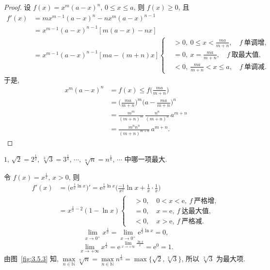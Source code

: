 \begin{proof}
设 $f(x)=x^{m}(a-x)^{n}$, $0\leqslant x\leqslant a$, 则 $f(x)\geqslant 0$, 且
\[
\begin{aligned}
f'(x)&=mx^{m-1}(a-x)^{n}-nx^{m}(a-x)^{n-1}\\
&=x^{m-1}(a-x)^{n-1}[m(a-x)-nx]\\
&=x^{m-1}(a-x)^{n-1}[ma-(m+n)x]
\left\{
\begin{aligned}
&>0,\ 0\leqslant x<\frac{ma}{m+n},\quad f\ \text{单调增},\\
&=0,\ x=\frac{ma}{m+n},\quad f\ \text{取最大值},\\
&<0,\ \frac{ma}{m+n}<x\leqslant a,\quad f\ \text{单调减}.
\end{aligned}
\right.
\end{aligned}
\]
于是,
\[
\begin{aligned}
x^{m}(a-x)^{n}&=f(x)\leqslant f\Big(\frac{ma}{m+n}\Big)\\
&=\Big(\frac{ma}{m+n}\Big)^{m}\Big(a-\frac{ma}{m+n}\Big)^{n}\\
&=\frac{m^{m}}{(m+n)^{m}}\,\frac{n^{n}}{(m+n)^{n}}\,a^{m+n}\\
&=\frac{m^{n}n^{n}}{(m+n)^{m+n}}\,a^{m+n}.
\end{aligned}
\]
\end{proof}

\begin{example}\label{ex:3.5.12}
$1$, $\sqrt{2}=2^{\frac{1}{2}}$, $\sqrt[3]{3}=3^{\frac{1}{3}}$, $\cdots$, $\sqrt[n]{n}=n^{\frac{1}{n}}$, $\cdots$ 中哪一项最大.
\end{example}

\begin{solution}
令 $f(x)=x^{\frac{1}{x}}$, $x>0$, 则
\[
\begin{aligned}
f'(x)&=\big(\mathrm{e}^{\frac{1}{x}\ln x}\big)'=\mathrm{e}^{\frac{1}{x}\ln x}\Big(\frac{-1}{x^{2}}\ln x+\frac{1}{x}\cdot\frac{1}{x}\Big)\\
&=x^{\frac{1}{x}-2}(1-\ln x)
\left\{
\begin{aligned}
&>0,\quad 0<x<\mathrm{e},\ f\ \text{严格增},\\
&=0,\quad x=\mathrm{e},\ f\ \text{达最大值},\\
&<0,\quad x>\mathrm{e},\ f\ \text{严格减}.
\end{aligned}
\right.
\end{aligned}
\]
\[
\lim_{x\to 0^{+}}x^{\frac{1}{x}}=\lim_{x\to 0^{+}}\mathrm{e}^{\frac{1}{x}\ln x}=0,
\]
\[
\lim_{x\to+\infty}x^{\frac{1}{x}}=\mathrm{e}^{\lim\limits_{x\to+\infty}\frac{\ln x}{x}}=\mathrm{e}^{0}=1.
\]
由图~\ref{fig:3.5.3} 知, $\max\limits_{n\in\mathbb{N}}\sqrt[n]{n}=\max\limits_{n\in\mathbb{N}}n^{\frac{1}{n}}=\max\{\sqrt{2},\sqrt[3]{3}\}$, 所以 $\sqrt[3]{3}$ 为最大项.
\end{solution}

